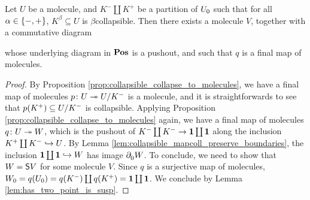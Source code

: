 \begin{prop} \label{prop:desuspension}
    Let \( U \) be a molecule, and \( K^- \coprod K^+ \) be a partition of \( \gr{0}{U} \) such that for all \( \a \in \set{-, +} \), \( K^\beta \subseteq U \) is \( \beta \)\nbd collapsible.
    Then there exists a molecule \( V \), together with a commutative diagram
    \begin{center}
    \end{center}
    whose underlying diagram in \( \Pos \) is a pushout, and such that \( q \) is a final map of molecules.
\end{prop}
\begin{proof}
    By Proposition \ref{prop:collapsible_collapse_to_molecules}, we have a final map of molecules \( p \colon U \surj \coll{K^-}{U} \) is a molecule, and it is straightforwards to see that \( p(K^+) \subseteq \coll{K^-}{U} \) is collapsible.
    Applying Proposition \ref{prop:collapsible_collapse_to_molecules} again, we have a final map of molecules \( q \colon U \surj W \), which is the pushout of \( K^- \coprod K^- \to \pt \coprod \pt \) along the inclusion \( K^+ \coprod K^- \incl U \).
    By Lemma \ref{lem:collapsible_mapcoll_preserve_boundaries}, the inclusion \( \pt \coprod \pt \incl W \) has image \( \bd{0}{} W \).
    To conclude, we need to show that \( W = \sus{V} \) for some molecule \( V \).
    Since \( q \) is a surjective map of molecules, \( \gr{0}{W} = q(\gr{0}{U}) = q(K^-) \coprod q(K^+) = \pt \coprod \pt \).
    We conclude by Lemma \ref{lem:has_two_point_is_susp}.
\end{proof}

